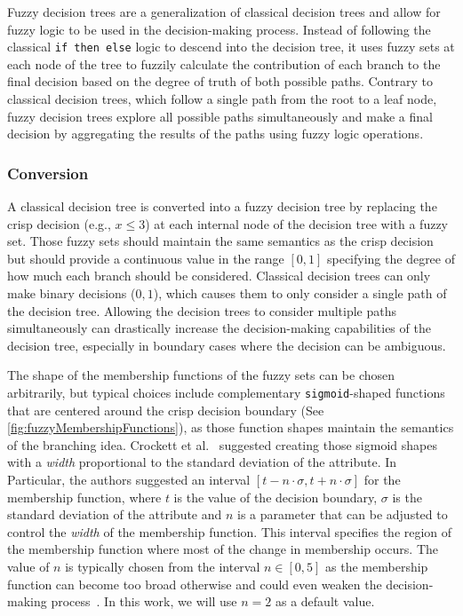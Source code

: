 Fuzzy decision trees are a generalization of classical decision trees and allow for fuzzy logic to be used in the decision-making process. Instead of following the classical \texttt{if then else} logic to descend into the decision tree, it uses fuzzy sets at each node of the tree to fuzzily calculate the contribution of each branch to the final decision based on the degree of truth of both possible paths. Contrary to classical decision trees, which follow a single path from the root to a leaf node, fuzzy decision trees explore all possible paths simultaneously and make a final decision by aggregating the results of the paths using fuzzy logic operations.

\subsubsection{Conversion}


A classical decision tree is converted into a fuzzy decision tree by replacing the crisp decision (e.g., $x \leq 3$) at each internal node of the decision tree with a fuzzy set. Those fuzzy sets should maintain the same semantics as the crisp decision but should provide a continuous value in the range $[0,1]$ specifying the degree of how much each branch should be considered. Classical decision trees can only make binary decisions (${0,1}$), which causes them to only consider a single path of the decision tree. Allowing the decision trees to consider multiple paths simultaneously can drastically increase the decision-making capabilities of the decision tree, especially in boundary cases where the decision can be ambiguous.


The shape of the membership functions of the fuzzy sets can be chosen arbitrarily, but typical choices include complementary \texttt{sigmoid}-shaped functions that are centered around the crisp decision boundary (See \autoref{fig:fuzzyMembershipFunctions}), as those function shapes maintain the semantics of the branching idea. Crockett et al.~\cite{CROCKETT20062809} suggested creating those sigmoid shapes with a \emph{width} proportional to the standard deviation of the attribute. In Particular, the authors suggested an interval $[t-n\cdot \sigma, t+n\cdot \sigma]$ for the membership function, where  $t$ is the value of the decision boundary, $\sigma$ is the standard deviation of the attribute and $n$ is a parameter that can be adjusted to control the \emph{width} of the membership function. This interval specifies the region of the membership function where most of the change in membership occurs. The value of $n$ is typically chosen from the interval $n\in [0,5]$ as the membership function can become too broad otherwise and could even weaken the decision-making process~\cite{CROCKETT20062809}. In this work, we will use $n=2$ as a default value.

